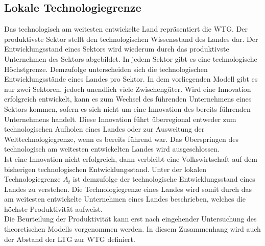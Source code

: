 \subsection{Lokale Technologiegrenze}
Das technologisch am weitesten entwickelte Land repräsentiert die WTG. Der produktiv\-ste Sektor stellt den technologischen Wissensstand des Landes dar. Der Entwicklungsstand eines Sektors wird wiederum durch das produktivste Unternehmen des Sektors abgebildet. 
In jedem Sektor gibt es eine technologische Höchstgrenze. Demzufolge unterscheiden sich die technologischen Entwicklungsstände eines Landes pro Sektor. In dem vorliegenden Modell gibt es nur zwei Sektoren, jedoch unendlich viele Zwischengüter. Wird eine Innovation erfolgreich entwickelt, kann es zum Wechsel des führenden Unternehmens eines Sektors kommen, sofern es sich nicht um eine Innovation des bereits führenden Unternehmens handelt. Diese Innovation führt überregional entweder zum technologischen Aufholen eines Landes oder zur Ausweitung der Welttechnologiegrenze, wenn es bereits führend war. Das Überspringen des technologisch am weitesten entwickelten Landes wird ausgeschlossen.\\
Ist eine Innovation nicht erfolgreich, dann verbleibt eine Volkswirtschaft auf dem bisherigen technologischen Entwicklungsstand. Unter der lokalen Technologiegrenze $A_t$ ist demzufolge der technologische Entwicklungsstand eines Landes zu verstehen. Die Technologiegrenze eines Landes wird somit durch das am weitesten entwickelte Unternehmen eines Landes beschrieben, welches die höchste Produktivität aufweist.\\ 
%
Die Beurteilung der Produktivität kann erst nach eingehender Untersuchung des theoretischen Modells vorgenommen werden. In diesem Zusammenhang wird auch der Abstand der LTG zur WTG definiert.
%
